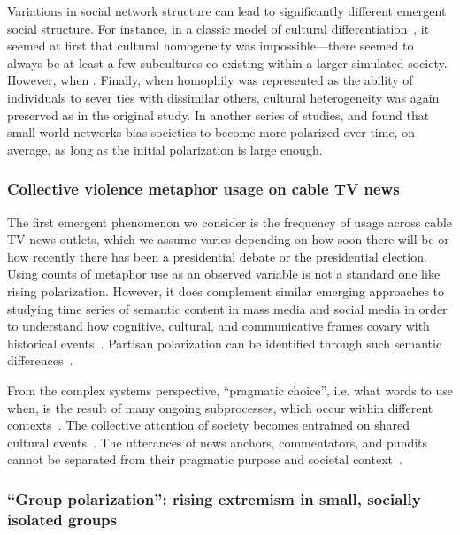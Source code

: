 \documentclass[12pt,letterpaper]{article}
\begin{document}
Variations in social network structure can lead to significantly different
emergent social structure. 
For instance, in a classic model of cultural differentiation~\cite{Axelrod1997},
it seemed at first that cultural homogeneity was impossible---there seemed to
always be at least a few subcultures co-existing within a larger simulated
society. However, when . Finally, when homophily was represented
as the ability of individuals to sever ties with dissimilar others, cultural
heterogeneity was again preserved as in the original study. In another series
of studies,  and  found that small world
networks bias societies to become more polarized over time, on average, 
as long as the initial polarization is large enough. 

\subsubsection{Collective violence metaphor usage on cable TV news}

The first emergent phenomenon we consider is the frequency of usage across
cable TV news outlets, which we assume varies depending on how soon there will
be or how recently there has been a presidential debate or the presidential 
election. Using counts of metaphor use as an observed variable 
is not a standard one like rising polarization. However, it does 
complement similar emerging approaches to studying time series of semantic content in
mass media and social media in order to understand how cognitive, cultural, and
communicative frames covary with historical 
events~\cite{Nunn2012,Klingenstein2014,Hamilton2016c,Caliskan2017,Barron2018,Garg2018}. 
Partisan polarization can be identified through such semantic differences~\cite{Gentzkow2019}.

From the complex systems perspective, ``pragmatic choice'', i.e. what words
to use when, is the result of many ongoing subprocesses, which occur within
different contexts~\cite{Gibbs2012a}. The collective attention of society becomes entrained on
shared cultural events~\cite{Fusaroli2015}. The utterances of news anchors, commentators, and 
pundits cannot be separated from their pragmatic purpose and societal context~\cite{Kovesces2010}.



\subsubsection{``Group polarization'': rising extremism in small, socially isolated groups}
\end{document}
